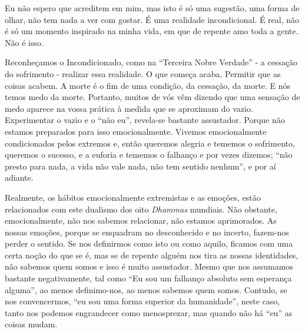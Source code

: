 Eu não espero que acreditem em mim, mas isto é só uma sugestão, uma
forma de olhar, não tem nada a ver com gostar. É uma realidade
incondicional. É real, não é só um momento inspirado na minha vida, em
que de repente amo toda a gente. Não é isso.

Reconheçamos o Incondicionado, como na ``Terceira Nobre Verdade'' - a
cessação do sofrimento - realizar essa realidade. O que começa acaba.
Permitir que as coisas acabem. A morte é o fim de uma condição, da
cessação, da morte. E nós temos medo da morte. Portanto, muitos de vós
vêm dizendo que uma sensação de medo aparece na vossa prática à medida
que se aproximam do vazio. Experimentar o vazio e o ``não eu'',
revela-se bastante assustador. Porque não estamos preparados para isso
emocionalmente. Vivemos emocionalmente condicionados pelos extremos e,
então queremos alegria e tememos o sofrimento, queremos o sucesso, e a
euforia e tememos o falhanço e por vezes dizemos; ``não presto para
nada, a vida não vale nada, não tem sentido nenhum'', e por aí adiante.

Realmente, os hábitos emocionalmente extremistas e as emoções, estão
relacionados com este dualismo dos oito \emph{Dhammas} mundiais. Não
obstante, emocionalmente, não nos sabemos relacionar, não estamos
aprimorados. As nossas emoções, porque se enquadram no desconhecido e no
incerto, fazem-nos perder o sentido. Se nos definirmos como isto ou como
aquilo, ficamos com uma certa noção do que se é, mas se de repente
alguém nos tira as nossas identidades, não sabemos quem somos e isso é
muito assustador. Mesmo que nos assumamos bastante negativamente, tal
como ``Eu sou um falhanço absoluto sem esperança alguma'', ao menos
definimo-nos, ao menos sabemos quem somos. Contudo, se nos convencermos,
``eu sou uma forma superior da humanidade'', neste caso, tanto nos
podemos engrandecer como menosprezar, mas quando não há ``eu'' as coisas
mudam.

